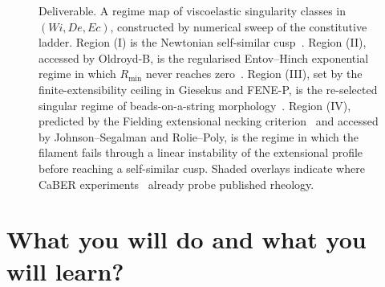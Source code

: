 \documentclass[11pt]{article}
\begin{document}
\begin{figure}[H]
\begin{center}
 \caption{Deliverable. A regime map of viscoelastic singularity classes in $(Wi, De, Ec)$, constructed by numerical sweep of the constitutive ladder. Region (I) is the Newtonian self-similar cusp~\citep{eggers1993universalPinchOff}. Region (II), accessed by Oldroyd-B, is the regularised Entov--Hinch exponential regime in which $R_{\min}$ never reaches zero~\citep{entovHinch1997}. Region (III), set by the finite-extensibility ceiling in Giesekus and FENE-P, is the re-selected singular regime of beads-on-a-string morphology~\citep{bhat2010beads}. Region (IV), predicted by the Fielding extensional necking criterion~\citep{fielding2011necking,hoyleFielding2016necking} and accessed by Johnson--Segalman and Rolie--Poly, is the regime in which the filament fails through a linear instability of the extensional profile before reaching a self-similar cusp. Shaded overlays indicate where CaBER experiments~\citep{mckinleyTripathi2000caber} already probe published rheology.}
 \label{fig:regime-map}
\end{center}
\end{figure}

\section*{What you will do and what you will learn?}
\end{document}
